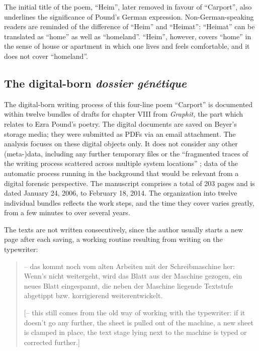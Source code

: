 \documentclass{article}
\begin{document}
The initial title of the poem, ``Heim'', later removed in favour of
``Carport'', also underlines the significance of Pound's German
expression. Non-German-speaking readers are reminded of the difference
of ``Heim'' and ``Heimat'': ``Heimat'' can be translated as ``home'' as
well as ``homeland''. ``Heim'', however, covers ``home'' in the sense of
house or apartment in which one lives and feels comfortable, and it does
not cover ``homeland''.



\subsection*{The digital-born \emph{dossier génétique}}

The digital-born writing process of this four-line poem ``Carport'' is
documented within twelve bundles of drafts for chapter VIII from
\emph{Graphit,} the part which relates to Ezra Pound's poetry. The
digital documents are saved on Beyer's storage media; they were
submitted as PDFs via an email attachment. The analysis focuses on these
digital objects only. It does not consider any other (meta-)data,
including any further temporary files or the ``fragmented traces of the
writing process scattered across multiple system locations'' \citep[391]{ries_rationale_2018}; data of the automatic process running in the background that would
be relevant from a digital forensic perspective. The manuscript
comprises a total of 203 pages and is dated January 24, 2006, to
February 18, 2014. The organization into twelve individual bundles
reflects the work steps, and the time they cover varies greatly, from a
few minutes to over several years.

The texts are not written consecutively, since the author usually starts
a new page after each saving, a working routine resulting from writing
on the typewriter:

\begin{quote}
-- das kommt noch vom alten Arbeiten mit der Schreibmaschine her: Wenn's
nicht weitergeht, wird das Blatt aus der Maschine gezogen, ein neues
Blatt eingespannt, die neben der Maschine liegende Textstufe abgetippt
bzw. korrigierend weiterentwickelt.

\vspace{1em}

[-- this still comes from the old way of working with the typewriter: if
it doesn't go any further, the sheet is pulled out of the machine, a new
sheet is clamped in place, the text stage lying next to the machine is
typed or corrected further.] 
\begin{flushright}
    \parencite{beyer_e-mail_2015}
\end{flushright} 
\end{quote}
\end{document}
